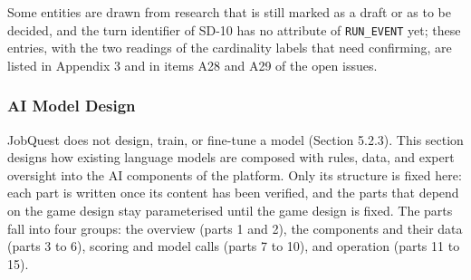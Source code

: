 Some entities are drawn from research that is still marked as a draft or as to be decided, and the turn identifier of SD-10 has no attribute of \texttt{RUN\_\allowbreak{}EVENT} yet; these entries, with the two readings of the cardinality labels that need confirming, are listed in Appendix 3 and in items A28 and A29 of the open issues.

\subsubsection{AI Model Design}

JobQuest does not design, train, or fine-tune a model (Section 5.2.3). This section designs how existing language models are composed with rules, data, and expert oversight into the AI components of the platform. Only its structure is fixed here: each part is written once its content has been verified, and the parts that depend on the game design stay parameterised until the game design is fixed. The parts fall into four groups: the overview (parts 1 and 2), the components and their data (parts 3 to 6), scoring and model calls (parts 7 to 10), and operation (parts 11 to 15).

